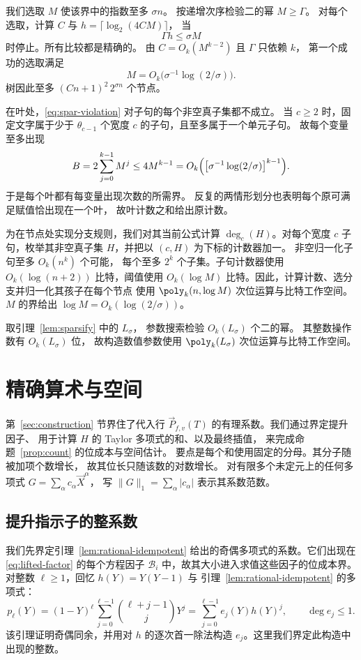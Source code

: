 我们选取 $M$ 使该界中的指数至多 $\sigma n$。
按递增次序检验二的幂 $M\ge\Gamma$。
对每个选取，计算 $C$ 与 $h=\lceil\log_2(4CM)\rceil$，
当
\[
 \Gamma h\le\sigma M
\]
时停止。所有比较都是精确的。
由 $C=O_k(M^{k-2})$ 且 $\Gamma$ 只依赖 $k$，
第一个成功的选取满足
\[
 M=O_k\bigl(\sigma^{-1}\log(2/\sigma)\bigr).
\]
树因此至多 $(Cn+1)^2\,2^{\sigma n}$ 个节点。

在叶处，\eqref{eq:spar-violation}
对子句的每个非空真子集都不成立。
当 $c\ge2$ 时，固定文字属于少于 $\theta_{c-1}$
个宽度 $c$ 的子句，且至多属于一个单元子句。
故每个变量至多出现
\[
 B=2\sum_{j=0}^{k-1}M^j
   \le4M^{k-1}
   =O_k\Bigl(\bigl[\sigma^{-1}\log(2/\sigma)\bigr]^{k-1}\Bigr).
\]
于是每个叶都有每变量出现次数的所需界。
反复的两情形划分也表明每个原可满足赋值恰出现在一个叶，
故叶计数之和给出原计数。

为在节点处实现分支规则，我们对其当前公式计算
$\deg_c(H)$。对每个宽度 $c$ 子句，枚举其非空真子集
$H$，并把以 $(c,H)$ 为下标的计数器加一。
非空归一化子句至多 $O_k(n^k)$ 个可能，
每个至多 $2^k$ 个子集。子句计数器使用
$O_k(\log(n+2))$ 比特，阈值使用 $O_k(\log M)$
比特。因此，计算计数、选分支并归一化其孩子在每个节点
使用 $\poly_k(n,\log M)$ 次位运算与比特工作空间。
$M$ 的界给出 $\log M=O_k(\log(2/\sigma))$。

取引理~\ref{lem:sparsify} 中的 $L_\sigma$，
参数搜索检验 $O_k(L_\sigma)$ 个二的幂。
其整数操作数有 $O_k(L_\sigma)$ 位，
故构造数值参数使用 $\poly_k(L_\sigma)$
次位运算与比特工作空间。

\section{精确算术与空间}\label{app:arithmetic}
第~\ref{sec:construction} 节界住了代入行
$\vec{P}_{f,v}(T)$ 的有理系数。我们通过界定提升因子、
用于计算 $H$ 的 Taylor 多项式的和、以及最终插值，
来完成命题~\ref{prop:count} 的位成本与空间估计。
要点是每个和使用固定的分母。其分子随被加项个数增长，
故其位长只随该数的对数增长。
对有限多个未定元上的任何多项式
$G=\sum_\alpha c_\alpha \vec{X}^{\alpha}$，
写 $\|G\|_1=\sum_\alpha|c_\alpha|$
表示其系数范数。

\subsection{提升指示子的整系数}
\label{subsec:rational-lift-height}
我们先界定引理~\ref{lem:rational-idempotent}
给出的奇偶多项式的系数。它们出现在
\eqref{eq:lifted-factor} 的每个方程因子 $\mathcal B_i$
中，故其大小进入求值这些因子的位成本界。
对整数 $\ell\ge1$，回忆 $h(Y)=Y(Y-1)$ 与
引理~\ref{lem:rational-idempotent} 的多项式：
\[
 p_\ell(Y)=(1-Y)^\ell\sum_{j=0}^{\ell-1}
                    \binom{\ell+j-1}{j}Y^j
          =\sum_{j=0}^{\ell-1}e_j(Y)h(Y)^j,
 \qquad \deg e_j\le1.
\]
该引理证明奇偶同余，并用对 $h$ 的逐次首一除法构造
$e_j$。这里我们界定此构造中出现的整数。

